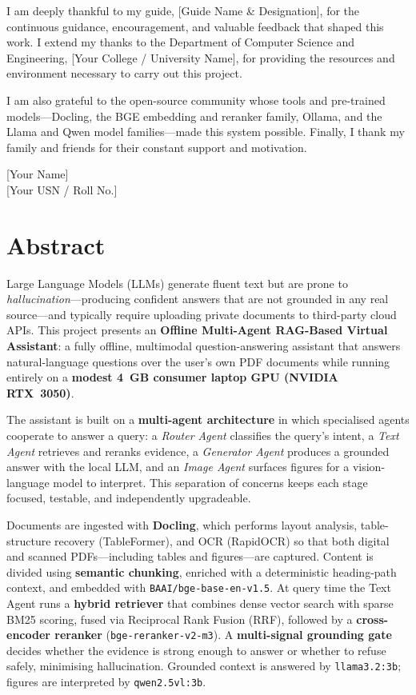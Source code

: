 \documentclass[12pt,a4paper]{report}
\newcommand{\StudentName}{[Your Name]}
\newcommand{\StudentID}{[Your USN / Roll No.]}
\newcommand{\GuideName}{[Guide Name \& Designation]}
\newcommand{\InstituteName}{[Your College / University Name]}
\newcommand{\DeptName}{Department of Computer Science and Engineering}
\begin{document}
I am deeply thankful to my guide, \GuideName, for the continuous guidance,
encouragement, and valuable feedback that shaped this work. I extend my thanks
to the \DeptName, \InstituteName, for providing the resources and environment
necessary to carry out this project.

I am also grateful to the open-source community whose tools and pre-trained
models---Docling, the BGE embedding and reranker family, Ollama, and the
Llama and Qwen model families---made this system possible. Finally, I thank my
family and friends for their constant support and motivation.

\vspace{0.5in}
\hfill \StudentName \\
\hfill \StudentID

\chapter*{Abstract}
Large Language Models (LLMs) generate fluent text but are prone to
\emph{hallucination}---producing confident answers that are not grounded in any
real source---and typically require uploading private documents to third-party
cloud APIs. This project presents an \textbf{Offline Multi-Agent RAG-Based
Virtual Assistant}: a fully offline, multimodal question-answering assistant that
answers natural-language questions over the user's own PDF documents while running
entirely on a \textbf{modest 4~GB consumer laptop GPU (NVIDIA RTX~3050)}.

The assistant is built on a \textbf{multi-agent architecture} in which specialised
agents cooperate to answer a query: a \emph{Router Agent} classifies the query's
intent, a \emph{Text Agent} retrieves and reranks evidence, a \emph{Generator
Agent} produces a grounded answer with the local LLM, and an \emph{Image Agent}
surfaces figures for a vision-language model to interpret. This separation of
concerns keeps each stage focused, testable, and independently upgradeable.

Documents are ingested with \textbf{Docling}, which performs layout analysis,
table-structure recovery (TableFormer), and OCR (RapidOCR) so that both digital
and scanned PDFs---including tables and figures---are captured. Content is divided
using \textbf{semantic chunking}, enriched with a deterministic heading-path
context, and embedded with \texttt{BAAI/bge-base-en-v1.5}. At query time the Text
Agent runs a \textbf{hybrid retriever} that combines dense vector search with
sparse BM25 scoring, fused via Reciprocal Rank Fusion (RRF), followed by a
\textbf{cross-encoder reranker} (\texttt{bge-reranker-v2-m3}). A \textbf{multi-signal
grounding gate} decides whether the evidence is strong enough to answer or whether
to refuse safely, minimising hallucination. Grounded context is answered by
\texttt{llama3.2:3b}; figures are interpreted by \texttt{qwen2.5vl:3b}.
\end{document}
